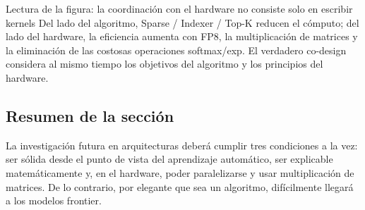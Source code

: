 \begin{knowledgebox}{Lectura de la figura: la coordinación con el hardware no consiste solo en escribir kernels}
Del lado del algoritmo, Sparse / Indexer / Top-K reducen el cómputo; del lado del hardware, la eficiencia aumenta con FP8, la multiplicación de matrices y la eliminación de las costosas operaciones softmax/exp. El verdadero co-design considera al mismo tiempo los objetivos del algoritmo y los principios del hardware.
\end{knowledgebox}

\subsection{Resumen de la sección}

La investigación futura en arquitecturas deberá cumplir tres condiciones a la vez: ser sólida desde el punto de vista del aprendizaje automático, ser explicable matemáticamente y, en el hardware, poder paralelizarse y usar multiplicación de matrices. De lo contrario, por elegante que sea un algoritmo, difícilmente llegará a los modelos frontier.
